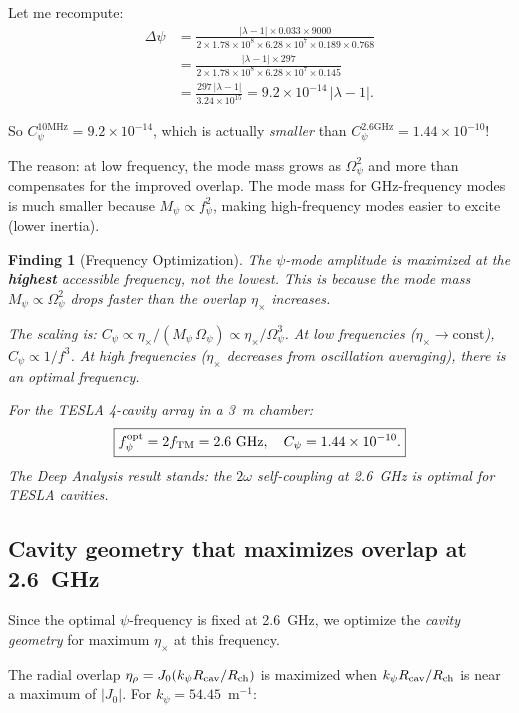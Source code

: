 \documentclass[11pt]{article}
\newtheorem{finding}{Finding}
\newcommand{\ee}[1]{\times 10^{#1}}
\newcommand{\Opsi}{\Omega_\psi}
\newcommand{\Mpsi}{M_\psi}
\newcommand{\lam}{\lambda}
\begin{document}
Let me recompute:
\begin{align}
\Delta\psi &= \frac{|\lam-1| \times 0.033 \times 9000}
{2 \times 1.78\ee{8} \times 6.28\ee{7} \times 0.189 \times 0.768}
\nonumber\\
&= \frac{|\lam-1| \times 297}
{2 \times 1.78\ee{8} \times 6.28\ee{7} \times 0.145}
\nonumber\\
&= \frac{297\,|\lam-1|}{3.24\ee{15}}
= 9.2\ee{-14}\,|\lam-1|.
\end{align}

So $C_\psi^{10\text{MHz}} = 9.2\ee{-14}$, which is actually
\emph{smaller} than $C_\psi^{2.6\text{GHz}} = 1.44\ee{-10}$!

The reason: at low frequency, the mode mass grows as $\Opsi^2$
and more than compensates for the improved overlap. The mode mass
for GHz-frequency modes is much smaller because
$\Mpsi \propto f_\psi^2$, making high-frequency modes easier to
excite (lower inertia).

\begin{finding}[Frequency Optimization]
\label{find:freq-opt}
The $\psi$-mode amplitude is maximized at the \textbf{highest}
accessible frequency, not the lowest. This is because the mode
mass $\Mpsi \propto \Opsi^2$ drops faster than the overlap
$\eta_\times$ increases.

The scaling is: $C_\psi \propto \eta_\times/(\Mpsi\,\Opsi)
\propto \eta_\times/\Opsi^3$. At low frequencies
($\eta_\times \to \text{const}$), $C_\psi \propto 1/f^3$.
At high frequencies ($\eta_\times$ decreases from oscillation
averaging), there is an optimal frequency.

For the TESLA 4-cavity array in a 3~m chamber:
\begin{equation}
\boxed{f_\psi^{\rm opt} = 2f_{\rm TM} = 2.6\text{ GHz},
\quad C_\psi = 1.44\ee{-10}.}
\end{equation}
The Deep Analysis result stands: the $2\omega$ self-coupling at
2.6~GHz is optimal for TESLA cavities.
\end{finding}

\subsection{Cavity geometry that maximizes overlap at 2.6~GHz}

Since the optimal $\psi$-frequency is fixed at 2.6~GHz, we optimize
the \emph{cavity geometry} for maximum $\eta_\times$ at this frequency.

The radial overlap $\eta_\rho = J_0(k_\psi R_{\rm cav}/R_{\rm ch})$
is maximized when $k_\psi R_{\rm cav}/R_{\rm ch}$ is near a maximum
of $|J_0|$. For $k_\psi = 54.45$~m$^{-1}$:
\end{document}
